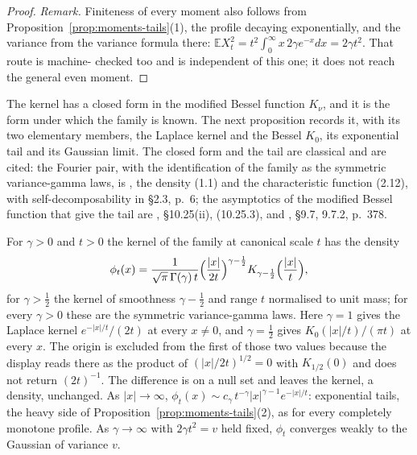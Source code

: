 \begin{proof}
\emph{Remark.} Finiteness of every moment also follows from
Proposition~\ref{prop:moments-tails}(1), the profile decaying exponentially, and the variance
from the variance formula there:
$\mathbb{E}X_t^2 = t^2\int_0^\infty x\,2\gamma e^{-x}dx = 2\gamma t^2$. That route is machine-
checked too and is independent of this one; it does not reach the general even moment.
\end{proof}

The kernel has a closed form in the modified Bessel function $K_\nu$, and it is the form under
which the family is known. The next proposition records it, with its two elementary members,
the Laplace kernel and the Bessel $K_0$, its exponential tail and its Gaussian limit. The
closed form and the tail are classical and are cited: the Fourier pair, with the
identification of the family as the symmetric variance-gamma laws, is
, the density (1.1) and the characteristic function (2.12), with
self-decomposability in \S2.3, p.~6; the asymptotics of the modified Bessel function that give
the tail are , \S10.25(ii), (10.25.3), and
, \S9.7, 9.7.2, p.~378.

\begin{proposition}\label{prop:matern-density}
For $\gamma > 0$ and $t > 0$ the kernel of the \Matern{} family at canonical scale $t$ has the
density
\[
  \phi_t(x) = \frac{1}{\sqrt\pi\,\Gamma(\gamma)\,t}
   \Bigl(\frac{|x|}{2t}\Bigr)^{\gamma - \frac12}
   K_{\gamma-\frac12}\Bigl(\frac{|x|}{t}\Bigr),
\]
for $\gamma > \tfrac12$ the \Matern{} kernel of smoothness $\gamma - \tfrac12$ and range $t$
normalised to unit mass; for every $\gamma > 0$ these are the symmetric variance-gamma laws. Here
$\gamma = 1$ gives the Laplace kernel $e^{-|x|/t}/(2t)$ at every $x \ne 0$, and
$\gamma = \tfrac12$ gives $K_0(|x|/t)/(\pi t)$ at every $x$. The origin is excluded from the first
of those two values because the display reads there as the product of $(|x|/2t)^{1/2} = 0$ with
$K_{1/2}(0)$ and does not return $(2t)^{-1}$. The difference is on a null set and leaves the
kernel, a density, unchanged.
As $|x| \to \infty$,
$\phi_t(x) \sim c_\gamma\,t^{-\gamma}|x|^{\gamma-1}e^{-|x|/t}$: exponential tails, the
heavy side of Proposition~\ref{prop:moments-tails}(2), as for every completely monotone profile. As
$\gamma \to \infty$ with $2\gamma t^2 = v$ held fixed, $\phi_t$ converges weakly to the
Gaussian of variance $v$.
\end{proposition}

